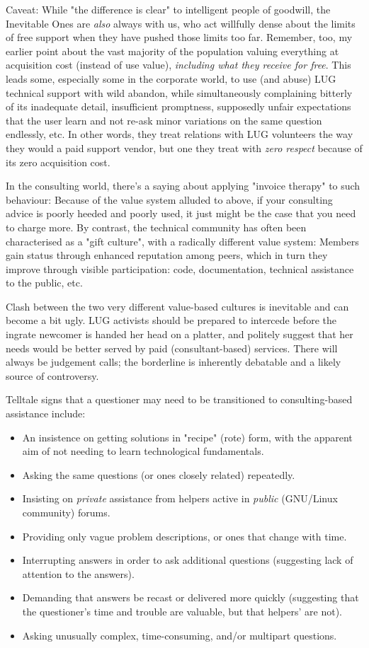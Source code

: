 \documentclass{HOWTO}
\begin{document}
Caveat:  While "the difference is clear" to intelligent people of goodwill,
the Inevitable Ones are {\itshape also\/} always with us, who act willfully
dense about the limits of free support when they have pushed those
limits too far.  Remember, too, my earlier point about the vast majority
of the population valuing everything at acquisition cost (instead of use
value), {\itshape including what they receive for free\/}.  This leads some,
especially some in the corporate world, to use (and abuse) LUG
technical support with wild abandon, while simultaneously complaining
bitterly of its inadequate detail, insufficient promptness, supposedly
unfair expectations that the user learn and not re-ask minor variations on
the same question endlessly, etc.  In other words, they treat relations
with LUG volunteers the way they would a paid support vendor, but one
they treat with {\itshape zero respect\/} because of its zero acquisition
cost.

In the consulting world, there's a saying about applying "invoice therapy" 
to such behaviour:  Because of the value system alluded to above, if
your consulting advice is poorly heeded and poorly used, it just might
be the case that you need to charge more.  By contrast, the technical
community has often been characterised as a "gift culture", with a
radically different value system: Members gain status through enhanced
reputation among peers, which in turn they improve through visible
participation:  code, documentation, technical assistance to the public,
etc.

Clash between the two very different value-based cultures is inevitable
and can become a bit ugly.  LUG activists should be prepared to intercede
before the ingrate newcomer is handed her head on a platter, and
politely suggest that her needs would be better served by paid
(consultant-based) services.  There will always be judgement calls;
the borderline is inherently debatable and a likely source of
controversy.

Telltale signs that a questioner may need to be transitioned to consulting-based assistance include:

\begin{itemize}
\item An insistence on getting solutions in "recipe" (rote) form, 
with the apparent aim of not needing to learn technological 
fundamentals.
\item Asking the same questions (or ones closely related) repeatedly.
\item Insisting on {\itshape private\/} assistance from helpers active in
{\itshape public\/} (GNU/Linux community) forums.
\item Providing only vague problem descriptions, or ones that change with time.
\item Interrupting answers in order to ask additional questions 
(suggesting lack of attention to the answers).
\item Demanding that answers be recast or delivered more quickly 
(suggesting that the questioner's time and trouble are 
valuable, but that helpers' are not).
\item Asking unusually complex, time-consuming, and/or multipart 
questions.
\end{itemize}
\end{document}
